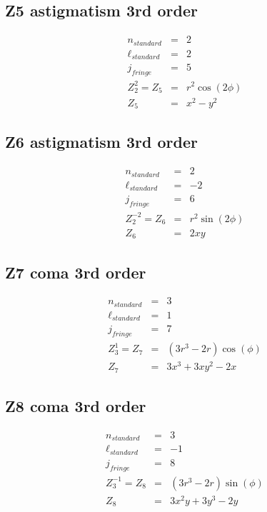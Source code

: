 \documentclass[10pt]{article}
\begin{document}
  \subsection{Z5 astigmatism 3rd order}
    \begin{subequations}
    \begin{eqnarray}
        n_{standard} &=&2\\
        \ell_{standard} &=&2\\
        j_{fringe} &=&5\\
        Z_{2}^{2} = Z_{5} &=& r^{2} \cos{\left(2 \phi \right)}\\
        Z_{5} &=& x^{2} - y^{2}
    \end{eqnarray}
    \end{subequations}
  \subsection{Z6 astigmatism 3rd order}
    \begin{subequations}
    \begin{eqnarray}
        n_{standard} &=&2\\
        \ell_{standard} &=&-2\\
        j_{fringe} &=&6\\
        Z_{2}^{-2} = Z_{6} &=& r^{2} \sin{\left(2 \phi \right)}\\
        Z_{6} &=& 2 x y
    \end{eqnarray}
    \end{subequations}
  \subsection{Z7 coma 3rd order}
    \begin{subequations}
    \begin{eqnarray}
        n_{standard} &=&3\\
        \ell_{standard} &=&1\\
        j_{fringe} &=&7\\
        Z_{3}^{1} = Z_{7} &=& \left(3 r^{3} - 2 r\right) \cos{\left(\phi \right)}\\
        Z_{7} &=& 3 x^{3} + 3 x y^{2} - 2 x
    \end{eqnarray}
    \end{subequations}
  \subsection{Z8 coma 3rd order}
    \begin{subequations}
    \begin{eqnarray}
        n_{standard} &=&3\\
        \ell_{standard} &=&-1\\
        j_{fringe} &=&8\\
        Z_{3}^{-1} = Z_{8} &=& \left(3 r^{3} - 2 r\right) \sin{\left(\phi \right)}\\
        Z_{8} &=& 3 x^{2} y + 3 y^{3} - 2 y
    \end{eqnarray}
    \end{subequations}
\end{document}
